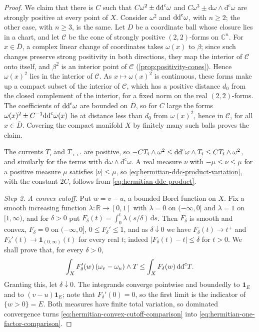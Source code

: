 \begin{proof}
We claim that there is $C$ such that $C\omega^2\pm\mathrm{dd}^{\mathrm{c}}\omega$ and $C\omega^3\pm\mathrm d\omega\wedge\mathrm d^{\mathrm c}\omega$ are strongly positive at every point of $X$. Consider $\omega^2$ and $\mathrm{dd}^{\mathrm{c}}\omega$, with $n\geq2$; the other case, with $n\geq3$, is the same. Let $D$ be a coordinate ball whose closure lies in a chart, and let $\mathcal C$ be the cone of strongly positive $(2,2)$-forms on $\mathbb C^n$. For $x\in\overline D$, a complex linear change of coordinates takes $\omega(x)$ to $\beta$; since such changes preserve strong positivity in both directions, they map the interior of $\mathcal C$ onto itself, and $\beta^2$ is an interior point of $\mathcal C$ (\cref{prop:positivity-cones}). Hence $\omega(x)^2$ lies in the interior of $\mathcal C$. As $x\mapsto\omega(x)^2$ is continuous, these forms make up a compact subset of the interior of $\mathcal C$, which has a positive distance $d_0$ from the closed complement of the interior, for a fixed norm on the real $(2,2)$-forms. The coefficients of $\mathrm{dd}^{\mathrm{c}}\omega$ are bounded on $\overline D$, so for $C$ large the forms $\omega(x)^2\pm C^{-1}\mathrm{dd}^{\mathrm{c}}\omega(x)$ lie at distance less than $d_0$ from $\omega(x)^2$, hence in $\mathcal C$, for all $x\in\overline D$. Covering the compact manifold $X$ by finitely many such balls proves the claim.

The currents $T_{\hat\imath}$ and $T_{\hat\imath\hat\imath'}$ are positive, so $-CT_{\hat\imath}\wedge\omega^2\leq\mathrm{dd}^{\mathrm{c}}\omega\wedge T_{\hat\imath}\leq CT_{\hat\imath}\wedge\omega^2$, and similarly for the terms with $\mathrm d\omega\wedge\mathrm d^{\mathrm c}\omega$. A real measure $\nu$ with $-\mu\leq\nu\leq\mu$ for a positive measure $\mu$ satisfies $|\nu|\leq\mu$, so \eqref{eq:hermitian-ddc-product-variation}, with the constant $2C$, follows from \eqref{eq:hermitian-ddc-product}.

\emph{Step 2. A convex cutoff.} Put $w=v-u$, a bounded Borel function on $X$. Fix a smooth increasing function $\lambda\colon\mathbb R\to[0,1]$ with $\lambda=0$ on $(-\infty,0]$ and $\lambda=1$ on $[1,\infty)$, and for $\delta>0$ put $F_\delta(t)=\int_0^t\lambda(s/\delta)\,\mathrm ds$. Then $F_\delta$ is smooth and convex, $F_\delta=0$ on $(-\infty,0]$, $0\leq F_\delta'\leq1$, and as $\delta\downarrow0$ we have $F_\delta(t)\to t^+$ and $F_\delta'(t)\to\mathbf1_{(0,\infty)}(t)$ for every real $t$; indeed $|F_\delta(t)-t|\leq\delta$ for $t>0$. We shall prove that, for every $\delta>0$,
\begin{equation}\label{eq:hermitian-convex-cutoff-comparison}
 \int_XF_\delta'(w)\,(\omega_v-\omega_u)\wedge T\leq\int_XF_\delta(w)\,\mathrm{dd}^{\mathrm{c}} T.
\end{equation}
Granting this, let $\delta\downarrow0$. The integrands converge pointwise and boundedly to $\mathbf1_E$ and to $(v-u)\mathbf1_E$; note that $F_\delta'(0)=0$, so the first limit is the indicator of $\{w>0\}=E$. Both measures have finite total variation, so dominated convergence turns \eqref{eq:hermitian-convex-cutoff-comparison} into \eqref{eq:hermitian-one-factor-comparison}.


\end{proof}
